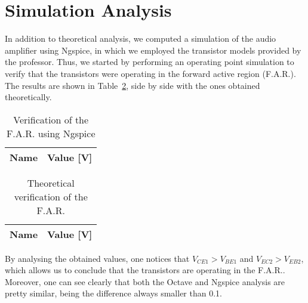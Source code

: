 \section{Simulation Analysis}
\label{sec:simulation}

In addition to theoretical analysis, we computed a simulation of the audio amplifier using Ngspice, in which we employed the transistor models provided by the professor. Thus, we started by performing an operating point simulation to verify that the transistors were operating in the forward active region (F.A.R.). The results are shown in Table~\ref{tab:opngspice}, side by side with the ones obtained theoretically.

\noindent
\begin{minipage}[c]{0.5\linewidth}

\begin{table}[H]
 \centering
 \begin{tabular}{|l|r|}
 \hline
 {\bf Name} & {\bf Value [V]} \\ \hline

 \end{tabular}
 \caption{Verification of the F.A.R. using Ngspice}
 \label{tab:opngspice}
 \end{table}
 
\end{minipage}
\begin{minipage}[c]{0.5\linewidth}

\vspace{-0.5mm}
 
 \begin{table}[H]
 \centering
 \begin{tabular}{|l|r|}
 \hline
 {\bf Name} & {\bf Value [V]} \\ \hline

 \end{tabular}
 \caption{Theoretical verification of the F.A.R.}
 \label{tab:opngspice}
 \end{table}
 
\end{minipage}

\vspace{3mm}

By analysing the obtained values, one notices that $V_{CE1}>V_{BE1}$ and $V_{EC2}>V_{EB2}$, which allows us to conclude that the transistors are operating in the F.A.R.. Moreover, one can see clearly that both the Octave and Ngspice analysis are pretty similar, being the difference always smaller than 0.1.\\


